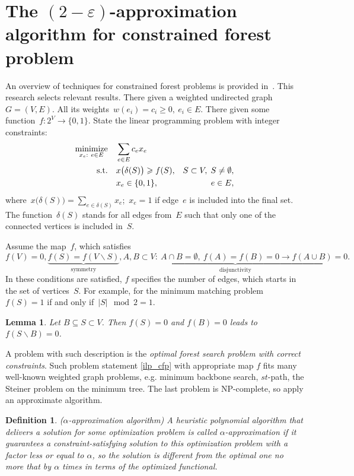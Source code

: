 \documentclass[12pt]{article}
\newtheorem{definition}{Definition}
\newtheorem{lemma}{Lemma}
\begin{document}
\section{The $(2-\varepsilon)$-approximation algorithm for constrained forest problem}

An overview of techniques for constrained forest problems is provided in~\cite{goemans1995general}. This research selects relevant  results. There given a weighted undirected graph~$G=(V,E)$. All its weights~$w(e_i)=c_i\geqslant 0,~ e_i\in E$. There given some function~$f:2^{V}\to \{0, 1\}$. State the linear programming problem with integer constraints:
\begin{align}
\underset{x_e:~e\in E}{\text{minimize}}\quad & \sum\limits_{e\in E}c_ex_e \nonumber\\
\text{s.t.\quad} & x\bigl(\delta(S)\bigr)\geqslant f(S), & S \subset V, \; S \not= \emptyset,
\label{ilp_cfp}\\
& x_e\in\{0,1\}, & e\in E,\nonumber
\end{align}
where~$x\bigl(\delta(S)\bigr)=\sum\limits_{e\in \delta(S)}x_e$;~$x_e=1$ if edge~$e$ is included into the final set. The function~$\delta(S)$ stands for all edges from~$E$ such that only one of the connected vertices is included in~$S$.

Assume the map~$f$, which satisfies
\[
f(V) = 0, \underbrace{f(S)=f(V\backslash S)}_{\text{symmetry}},
\underbrace{A,B\subset V:~A\cap B = \emptyset,~f(A)=f(B)=0\to f(A\cup B) = 0}_{\text{disjunctivity}}.
\]
In these conditions are satisfied, $f$ specifies the number of edges, which starts in the set of vertices~$S$. For example, for the minimum %
matching problem~$f (S) = 1$ if and only if~\mbox{$|S|\mod 2 = 1$.}

\begin{lemma}
  Let $B\subseteq S\subset V$. Then $f(S) = 0$ and $f(B) = 0$ leads to $f(S\backslash B) = 0$.
  \label{lem1}
\end{lemma}
A problem with such description is the \emph{optimal forest search problem with correct constraints}. Such problem statement \eqref{ilp_cfp} with appropriate map $f$ fits many well-known weighted graph problems, e.g. minimum backbone search, $st$-path, the Steiner problem on the minimum tree. The last problem is NP-complete, so apply an approximate algorithm.

\begin{definition} {($\alpha$-approximation algorithm)}
A heuristic polynomial algorithm that delivers a solution for some optimization problem is called $\alpha$-approximation if it guarantees a constraint-satisfying solution to this optimization problem with a factor less or equal to $\alpha$, so the solution is different from the optimal one no more that by $\alpha$ times in terms of the optimized functional.
\end{definition}
\end{document}
